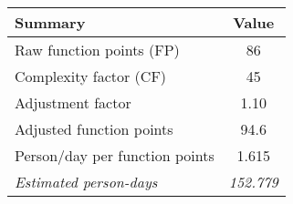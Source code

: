 \begin{tabular}{l|c}
\textbf{Summary} & \textbf{Value} \\ \hline
Raw function points (FP) & 86 \\
Complexity factor (CF) & 45 \\
Adjustment factor & 1.10 \\
Adjusted function points & 94.6 \\
Person/day per function points & 1.615 \\ \hline
\textit{Estimated person-days} & \textit{152.779}
\end{tabular}
